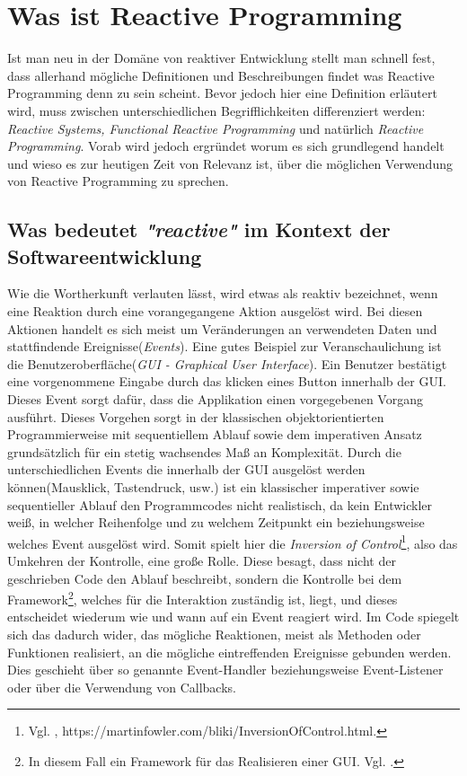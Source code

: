 \chapter{Was ist Reactive Programming}\label{was_ist_reactive_programming}
Ist man neu in der Domäne von reaktiver Entwicklung stellt man schnell fest, dass allerhand mögliche Definitionen und Beschreibungen findet was Reactive Programming denn zu sein scheint. Bevor jedoch hier eine Definition erläutert wird, muss zwischen unterschiedlichen Begrifflichkeiten differenziert werden: \textit{Reactive Systems, Functional Reactive Programming} und natürlich \textit{Reactive Programming}. Vorab wird jedoch ergründet worum es sich grundlegend handelt und wieso es zur heutigen Zeit von Relevanz ist, über die möglichen Verwendung von Reactive Programming zu sprechen.
\section{Was bedeutet \textit{"reactive"} im Kontext der Softwareentwicklung}
Wie die Wortherkunft verlauten lässt, wird etwas als reaktiv bezeichnet, wenn eine Reaktion durch eine vorangegangene Aktion ausgelöst wird. Bei diesen Aktionen handelt es sich meist um Veränderungen an verwendeten Daten und stattfindende Ereignisse(\textit{Events}). Eine gutes Beispiel zur Veranschaulichung ist die Benutzeroberfläche(\textit{GUI - Graphical User Interface}). Ein Benutzer bestätigt eine vorgenommene Eingabe durch das klicken eines Button innerhalb der GUI. Dieses Event sorgt dafür, dass die Applikation einen vorgegebenen Vorgang ausführt. Dieses Vorgehen sorgt in der klassischen objektorientierten Programmierweise mit sequentiellem Ablauf sowie dem imperativen Ansatz grundsätzlich für ein stetig wachsendes Maß an Komplexität. Durch die unterschiedlichen Events die innerhalb der GUI ausgelöst werden können(Mausklick, Tastendruck, usw.) ist ein klassischer imperativer sowie sequentieller Ablauf den Programmcodes nicht realistisch, da kein Entwickler weiß, in welcher Reihenfolge und zu welchem Zeitpunkt ein beziehungsweise welches Event ausgelöst wird. Somit spielt hier die \textit{Inversion of Control}\footnote{Vgl. \cite{MartinFowler.2005}, https://martinfowler.com/bliki/InversionOfControl.html.}, also das Umkehren der Kontrolle, eine große Rolle. Diese besagt, dass nicht der geschrieben Code den Ablauf beschreibt, sondern die Kontrolle bei dem Framework\footnote{In diesem Fall ein Framework für das Realisieren einer GUI. Vgl. \cite{wiki.guilist}.}, welches für die Interaktion zuständig ist, liegt, und dieses entscheidet wiederum wie und wann auf ein Event reagiert wird. Im Code spiegelt sich das dadurch wider, das mögliche Reaktionen, meist als Methoden oder Funktionen realisiert, an die mögliche eintreffenden Ereignisse gebunden werden. Dies geschieht über so genannte Event-Handler beziehungsweise Event-Listener oder über die Verwendung von Callbacks. 

